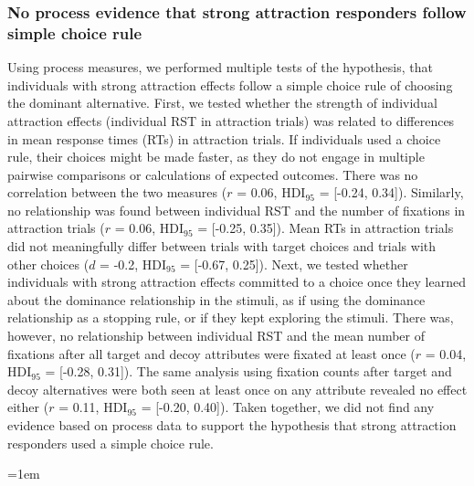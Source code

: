 \documentclass[11pt, a4paper]{article}
\begin{document}
\begin{refsection}
\subsubsection*{No process evidence that strong attraction responders follow simple choice rule}
Using process measures, we performed multiple tests of the hypothesis, that individuals with strong attraction effects follow a simple choice rule of choosing the dominant alternative. First, we tested whether the strength of individual attraction effects (individual RST in attraction trials) was related to differences in mean response times (RTs) in attraction trials. If individuals used a choice rule, their choices might be made faster, as they do not engage in multiple pairwise comparisons or calculations of expected outcomes. There was no correlation between the two measures ($r$ = 0.06, HDI$_{95}$ = [-0.24, 0.34]). Similarly, no relationship was found between individual RST and the number of fixations in attraction trials ($r$ = 0.06, HDI$_{95}$ = [-0.25, 0.35]). Mean RTs in attraction trials did not meaningfully differ between trials with target choices and trials with other choices ($d$ = -0.2, HDI$_{95}$ = [-0.67, 0.25]). Next, we tested whether individuals with strong attraction effects committed to a choice once they learned about the dominance relationship in the stimuli, as if using the dominance relationship as a stopping rule, or if they kept exploring the stimuli. There was, however, no relationship between individual RST and the mean number of fixations after all target and decoy attributes were fixated at least once ($r$ = 0.04, HDI$_{95}$ = [-0.28, 0.31]). The same analysis using fixation counts after target and decoy alternatives were both seen at least once on any attribute revealed no effect either ($r$ = 0.11, HDI$_{95}$ = [-0.20, 0.40]).
Taken together, we did not find any evidence based on process data to support the hypothesis that strong attraction responders used a simple choice rule.

\renewcommand*{\bibfont}{\small}
\emergencystretch=1em %
\printbibliography[title=Supplementary Information References]

\end{refsection} %
\renewcommand{\thepage}{S\arabic{page}}
\end{document}

